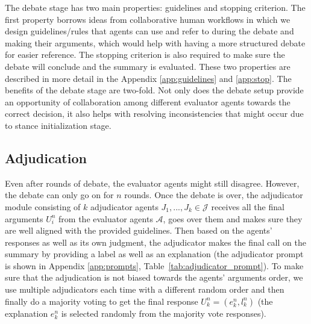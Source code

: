 The debate stage has two main properties: guidelines and stopping criterion.
The first property borrows ideas from collaborative human workflows in which we design guidelines/rules that agents can use and refer to during the debate and making their arguments, which would help with having a more structured debate for easier reference. The stopping criterion is also required to make sure the debate will conclude and the summary is evaluated. These two properties are described in more detail in the Appendix \ref{app:guidelines} and \ref{app:stop}.
% 
The benefits of the debate stage are two-fold. 
Not only does the debate setup provide an opportunity of collaboration among different evaluator agents towards the correct decision, it also helps with resolving inconsistencies that might occur due to stance initialization stage.

\subsection{Adjudication}

Even after rounds of debate, the evaluator agents might still disagree. However, the debate can only go on for $n$ rounds. Once the debate is over, the adjudicator module consisting of $k$ adjudicator agents $J_1, ..., J_k \in \mathcal{J}$ receives all the final arguments $U^n_i$ from the evaluator agents $\mathcal{A}$, goes over them and makes sure they are well aligned with the provided guidelines. 
Then based on the agents’ responses as well as its own judgment, the adjudicator makes the final call on the summary by providing a label as well as an explanation (the adjudicator prompt is shown in Appendix \ref{app:prompts}, Table~\ref{tab:adjudicator_prompt}). To make sure that the adjudication is not biased towards the agents’ arguments order, we use multiple adjudicators each time with a different random order and then finally do a majority voting to get the final response $U^n_k = (e^n_k, l^n_k)$ (the explanation $e^n_k$ is selected randomly from the majority vote responses).

